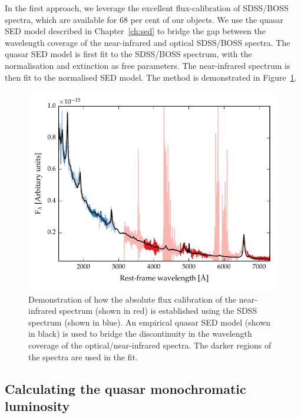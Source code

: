 In the first approach, we leverage the excellent flux-calibration of SDSS/BOSS spectra, which are available for 68 per cent of our objects. 
We use the quasar SED model described in Chapter~\ref{ch:sed} to bridge the gap between the wavelength coverage of the near-infrared and optical SDSS/BOSS spectra.
The quasar SED model is first fit to the SDSS/BOSS spectrum, with the normalisation and extinction \ebv as free parameters. 
The near-infrared spectrum is then fit to the normalised SED model. 
The method is demonstrated in Figure~\ref{fig:normalise_to_sdss}. 

\begin{figure}
    \centering
    \includegraphics[width=\textwidth]{figures/chapter02/normalise_to_sdss.pdf} 
    \caption[{}]{Demonstration of how the absolute flux calibration of the near-infrared spectrum (shown in red) is established using the SDSS spectrum (shown in blue). An empirical quasar SED model (shown in black) is used to bridge the discontinuity in the wavelength coverage of the optical/near-infrared spectra. The darker regions of the spectra are used in the fit.}     
    \label{fig:normalise_to_sdss}
\end{figure}


\subsection{Calculating the quasar monochromatic luminosity}










